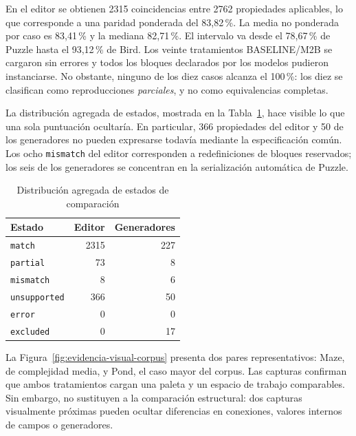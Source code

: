 En el editor se obtienen 2315 coincidencias entre 2762 propiedades aplicables,
lo que corresponde a una paridad ponderada del 83,82\,\%. La media no ponderada
por caso es 83,41\,\% y la mediana 82,71\,\%. El intervalo va desde el 78,67\,\%
de Puzzle hasta el 93,12\,\% de Bird. Los veinte tratamientos BASELINE/M2B se
cargaron sin errores y todos los bloques declarados por los modelos pudieron
instanciarse. No obstante, ninguno de los diez casos alcanza el 100\,\%: los
diez se clasifican como reproducciones \emph{parciales}, y no como equivalencias
completas.

La distribución agregada de estados, mostrada en la
Tabla~\ref{tab:estados-agregados}, hace visible lo que una sola puntuación
ocultaría. En particular, 366 propiedades del editor y 50 de los generadores no
pueden expresarse todavía mediante la especificación común. Los ocho
\texttt{mismatch} del editor corresponden a redefiniciones de bloques reservados;
los seis de los generadores se concentran en la serialización automática de
Puzzle.

\begin{table}[htbp]
  \centering
  \caption{Distribución agregada de estados de comparación}
  \label{tab:estados-agregados}
  \begin{tabular}{lrr}
    \toprule
    Estado & Editor & Generadores \\
    \midrule
    \texttt{match}       & 2315 & 227 \\
    \texttt{partial}     &   73 &   8 \\
    \texttt{mismatch}    &    8 &   6 \\
    \texttt{unsupported} &  366 &  50 \\
    \texttt{error}       &    0 &   0 \\
    \texttt{excluded}    &    0 &  17 \\
    \bottomrule
  \end{tabular}
\end{table}

La Figura~\ref{fig:evidencia-visual-corpus} presenta dos pares representativos:
Maze, de complejidad media, y Pond, el caso mayor del corpus. Las capturas
confirman que ambos tratamientos cargan una paleta y un espacio de trabajo
comparables. Sin embargo, no sustituyen a la comparación estructural: dos
capturas visualmente próximas pueden ocultar diferencias en conexiones,
valores internos de campos o generadores.

